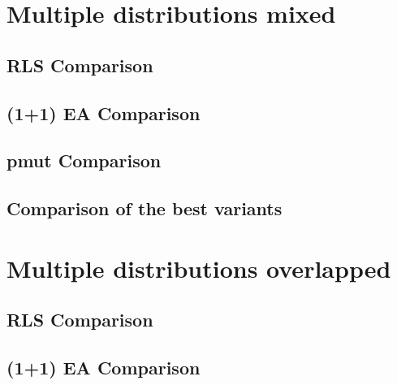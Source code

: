 
\section{Multiple distributions mixed}

\subsection{RLS Comparison}





\subsection{(1+1) EA Comparison}





\subsection{pmut Comparison}





\subsection{Comparison of the best variants}





\section{Multiple distributions overlapped}

\subsection{RLS Comparison}





\subsection{(1+1) EA Comparison}


